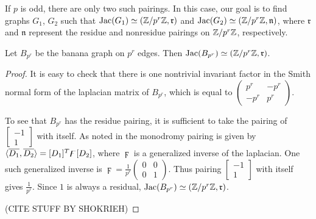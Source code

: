 \documentclass{amsart}
\begin{document}
If $p$ is odd, there are only two such pairings. In this case, our
goal is to find graphs $G_1$, $G_2$ such that $\operatorname{Jac}(G_1) \simeq
(\mathbb{Z}/p^r\mathbb{Z}, \mathfrak{r})$ and $\operatorname{Jac}(G_2) \simeq (\mathbb{Z}/p^r\mathbb{Z},
\mathfrak{n})$, where $\mathfrak{r}$ and $\mathfrak{n}$ represent the
residue and nonresidue pairings on $\mathbb{Z}/p^r\mathbb{Z}$, respectively. 

\begin{prop}
  \label{prop:banana_residue}
  Let $B_{p^r}$ be the banana graph on $p^r$ edges. Then
  $\operatorname{Jac}(B_{p^r}) \simeq (\mathbb{Z}/p^r\mathbb{Z}, \mathfrak{r})$.
\end{prop}

\begin{proof}

It is easy to check that there is one nontrivial invariant factor in the Smith normal form of the laplacian matrix of $B_{p^r}$, which is equal to $\left(\begin{array}{cc}p^{r}&-p^r\\-p^r&p^r\end{array}\right)$.

 To see that $B_{p^r}$ has the residue pairing, it is sufficient to take the pairing of $\left[\begin{array}{c}-1\\1\end{array}\right]$ with itself. As noted in %
the monodromy pairing is given by $\langle \overline{D_1}, \overline{D_{2}} \rangle=[D_1]^{T}\digamma[D_2]$, where $\digamma$ is a generalized inverse of the laplacian. One such generalized inverse is $\digamma=\frac{1}{p^{r}}\left(\begin{array}{cc}0&0\\0&1\end{array}\right)$. Thus pairing $\left[\begin{array}{c}-1\\1\end{array}\right]$ with itself gives $\frac{1}{p^{r}}$. Since $1$ is always a residual, $\operatorname{Jac}(B_{p^r}) \simeq (\mathbb{Z}/p^r\mathbb{Z}, \mathfrak{r})$.

(CITE STUFF BY SHOKRIEH)
\end{proof}


\begin{center}
\end{center}
\end{document}
